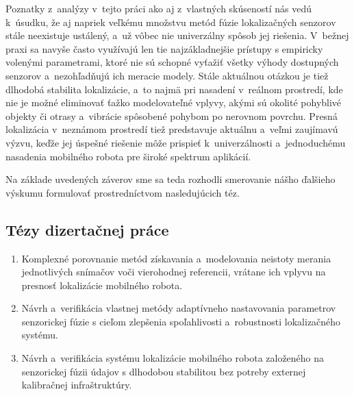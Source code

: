 
Poznatky z~analýzy v~tejto práci ako aj z~vlastných skúseností nás vedú k~úsudku, že aj napriek veľkému množstvu metód fúzie lokalizačných senzorov stále neexistuje ustálený, a~už vôbec nie univerzálny spôsob jej riešenia. V~bežnej praxi sa navyše často využívajú len tie najzákladnejšie prístupy s empiricky volenými parametrami, ktoré nie sú schopné vyťažiť všetky výhody dostupných senzorov a~nezohľadňujú ich meracie modely. Stále aktuálnou otázkou je tiež dlhodobá stabilita lokalizácie, a~to najmä pri nasadení v~reálnom prostredí, kde nie je možné eliminovať ťažko modelovateľné vplyvy, akými sú okolité pohyblivé objekty či otrasy a~vibrácie spôsobené pohybom po nerovnom povrchu. Presná lokalizácia v~neznámom prostredí tiež predstavuje aktuálnu a~veľmi zaujímavú výzvu, keďže jej úspešné riešenie môže prispieť k~univerzálnosti a~jednoduchému nasadenia mobilného robota pre široké spektrum aplikácií.

Na základe uvedených záverov sme sa teda rozhodli smerovanie nášho ďalšieho výskumu formulovať prostredníctvom nasledujúcich téz.

\subsection*{Tézy dizertačnej práce}

\begin{enumerate}
\item Komplexné porovnanie metód získavania a~modelovania neistoty merania jednotlivých snímačov voči vierohodnej referencii, vrátane ich vplyvu na presnosť lokalizácie mobilného robota.
\item Návrh a~verifikácia vlastnej metódy adaptívneho nastavovania parametrov senzorickej fúzie s cieľom zlepšenia spoľahlivosti a~robustnosti lokalizačného systému.
\item Návrh a~verifikácia systému lokalizácie mobilného robota založeného na senzorickej fúzii údajov s dlhodobou stabilitou bez potreby externej kalibračnej infraštruktúry.
\end{enumerate}